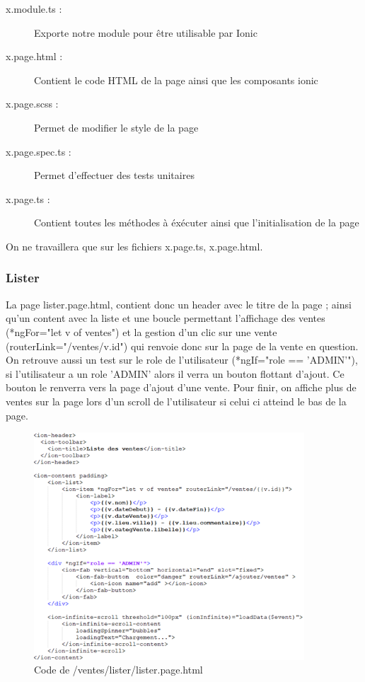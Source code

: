 			\begin{description}
				\item[x.module.ts :]{Exporte notre module pour être utilisable par Ionic}
				\item[x.page.html :]{Contient le code HTML de la page ainsi que les composants ionic}
				\item[x.page.scss :]{Permet de modifier le style de la page}
				\item[x.page.spec.ts :]{Permet d'effectuer des tests unitaires}
				\item[x.page.ts :]{Contient toutes les méthodes à éxécuter ainsi que l'initialisation de la page}
			\end{description}

			On ne travaillera que sur les fichiers x.page.ts, x.page.html.

			\subsubsection{Lister}

					La page lister.page.html, contient donc un header avec le titre de la page ; ainsi qu'un content avec la liste et une boucle permettant l'affichage des ventes (*ngFor="let v of ventes") et la gestion d'un clic sur une vente (routerLink="/ventes/{{v.id}}") qui renvoie donc sur la page de la vente en question. \newline
					On retrouve aussi un test sur le role de l'utilisateur (*ngIf="role == 'ADMIN'"), si l'utilisateur a un role 'ADMIN' alors il verra un bouton flottant d'ajout. Ce bouton le renverra vers la page d'ajout d'une vente. \newline
					Pour finir, on affiche plus de ventes sur la page lors d'un scroll de l'utilisateur si celui ci atteind le bas de la page.

					\begin{figure}[H]
						\centering\includegraphics[width=0.9\textwidth, keepaspectratio]{res/lister.png}
						\caption{Code de /ventes/lister/lister.page.html}
					\end{figure}

